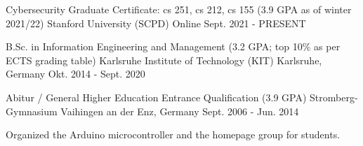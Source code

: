 

\begin{cventries}

  \cventry
    {Cybersecurity Graduate Certificate: cs 251, cs 212, cs 155 (3.9 GPA as of winter 2021/22)} %
    {Stanford University (SCPD)} %
    {Online} %
    {Sept. 2021 - PRESENT} %
    {}

  \cventry
    {B.Sc. in Information Engineering and Management (3.2 GPA; top 10\% as per ECTS grading table)} %
    {Karlsruhe Institute of Technology (KIT) } %
    {Karlsruhe, Germany} %
    {Okt. 2014 - Sept. 2020} %
    {}
  
  \cventry
    {Abitur / General Higher Education Entrance Qualification  (3.9 GPA)} %
    {Stromberg-Gymnasium} %
    {Vaihingen an der Enz, Germany} %
    {Sept. 2006 - Jun. 2014} %
    {
      \begin{cvitems} %
        \item {Organized the Arduino microcontroller and the homepage group for students.}
      \end{cvitems}
    }

\end{cventries}
